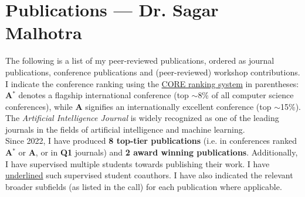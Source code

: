 \documentclass[10pt, a4paper]{article}
\begin{document}
\section*{%
Publications --- Dr. Sagar Malhotra\\[-.4em]%
}
The following is a list of my peer-reviewed publications, ordered as journal publications, conference publications and (peer-reviewed) workshop contributions.
I indicate the conference ranking using the \href{https://portal.core.edu.au/conf-ranks/}{CORE ranking system} in parentheses: \textbf{A$^{*}$} denotes a flagship international conference (top $\sim$8\% of all computer science conferences), while \textbf{A} signifies an internationally excellent conference (top $\sim$15\%).
The \emph{Artificial Intelligence Journal} is widely recognized as one of the leading journals in the fields of artificial intelligence and machine learning.\\


Since 2022, I have produced \textbf{8 top-tier publications} (i.e. in conferences ranked \textbf{A$^{*}$} or \textbf{A}, or in \textbf{Q1} journals) and \textbf{2 award winning publications}.
Additionally, I have supervised multiple students towards publishing their work. I have \uline{underlined} such supervised student coauthors. I have also indicated the relevant broader subfields (as listed in the call) for each publication where applicable.




\end{document}
